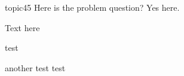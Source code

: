 \begin{problem}[requires=some label]{topic}{45}
Here is the problem question?
\label{   label 1   }
Yes here.

\begin{answers}
\answer[correct] Text here

    test

\answer[correct] another test
             test
\end {answers}
 
 \end{problem}